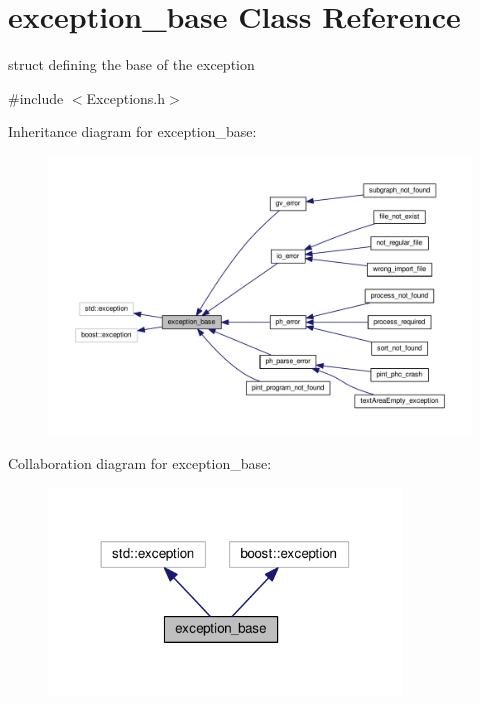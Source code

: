 \hypertarget{structexception__base}{\section{exception\+\_\+base Class Reference}
\label{structexception__base}
}


struct defining the base of the exception  




{\ttfamily \#include $<$Exceptions.\+h$>$}



Inheritance diagram for exception\+\_\+base\+:\nopagebreak
\begin{figure}[H]
\begin{center}
\leavevmode
\includegraphics[width=350pt]{structexception__base__inherit__graph}
\end{center}
\end{figure}


Collaboration diagram for exception\+\_\+base\+:\nopagebreak
\begin{figure}[H]
\begin{center}
\leavevmode
\includegraphics[width=266pt]{structexception__base__coll__graph}
\end{center}
\end{figure}


